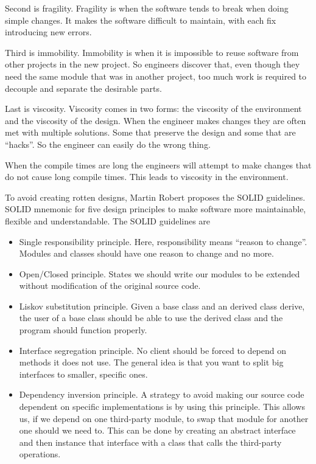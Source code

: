 \documentclass[12pt]{article}
\theoremstyle{definition}
\theoremstyle{theorem}
\begin{document}
Second is fragility. Fragility is when the software tends to break when doing
simple changes. It makes the software difficult to maintain, with each fix
introducing new errors.

Third is immobility. Immobility is when it is impossible to reuse software from
other projects in the new project. So engineers discover that, even though they
need the same module that was in another project, too much work is required to
decouple and separate the desirable parts.

Last is viscosity. Viscosity comes in two forms: the viscosity of the
environment and the viscosity of the design. When the engineer makes changes
they are often met with multiple solutions. Some that preserve the design and
some that are ``hacks''. So the engineer can easily do the wrong thing.

When the compile times are long the engineers will attempt to make changes that
do not cause long compile times. This leads to viscosity in the environment.

To avoid creating rotten designs, Martin Robert proposes the SOLID guidelines.
SOLID mnemonic for five design principles to make software more maintainable,
flexible and understandable. The SOLID guidelines are

\begin{itemize}
    \item Single responsibility principle. Here, responsibility means ``reason
        to change''. Modules and classes should have one reason to change and no
        more.
    \item Open/Closed principle. States we should write our modules to be
        extended without modification of the original source code.
    \item Liskov substitution principle. Given a base class and an derived
        class derive, the user of a base class should be able to use the derived
        class and the program should function properly.
    \item Interface segregation principle. No client should be forced to depend
        on methods it does not use. The general idea is that you want to split
        big interfaces to smaller, specific ones.
    \item Dependency inversion principle. A strategy to avoid making our source
        code dependent on specific implementations is by using this principle.
        This allows us, if we depend on one third-party module, to swap that
        module for another one should we need to. This can be done by creating
        an abstract interface and then instance that interface with a class that
        calls the third-party operations.~\cite{martinrobert}
\end{itemize}
\end{document}
